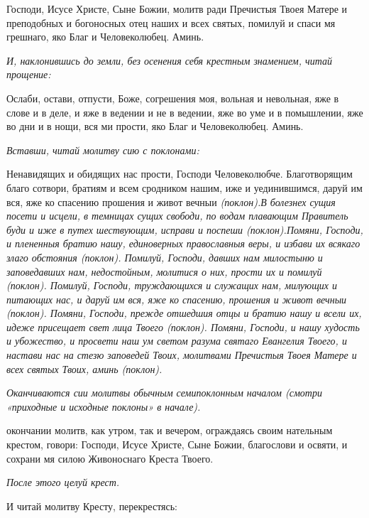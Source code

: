 

Господи, Исусе Христе, Сыне Божии, молитв ради Пречистыя Твоея Матере и преподобных и богоносных отец наших и всех святых, помилуй и спаси мя грешнаго, яко Благ и Человеколюбец. Аминь.


\medskip\itshape И, наклонившись до земли, без осенения себя крестным знамением, читай прощение: \normalfont{}


Ослаби, остави, отпусти, Боже, согрешения моя, вольная и невольная, яже в слове и в деле, и яже в ведении и не в ведении, яже во уме и в помышлении, яже во дни и в нощи, вся ми прости, яко Благ и Человеколюбец. Аминь. 


\medskip\itshape Вставши, читай молитву сию с поклонами:\normalfont{}


Ненавидящих и обидящих нас прости, Господи Человеколюбче. Благотворящим благо сотвори, братиям и всем сродником нашим, иже и уединившимся, даруй им вся, яже ко спасению прошения и живот вечныи \itshape (поклон)\normalfont{}.В болезнех сущия посети и исцели, в темницах сущих свободи, по водам плавающим Правитель буди и иже в путех шествующим, исправи и поспеши \itshape (поклон)\normalfont{}.Помяни, Господи, и плененныя братию нашу, единоверных православныя веры, и избави их всякаго злаго обстояния \itshape (поклон)\normalfont{}. Помилуй, Господи, давших нам милостыню и заповедавших нам, недостойным, молитися о них, прости их и помилуй \itshape (поклон)\normalfont{}. Помилуй, Господи, труждающихся и служащих нам, милующих и питающих нас, и даруй им вся, яже ко спасению, прошения и живот вечныи \itshape (поклон)\normalfont{}. Помяни, Господи, прежде отшедшия отцы и братию нашу и всели их, идеже присещает свет лица Твоего \itshape (поклон)\normalfont{}. Помяни, Господи, и нашу худость и убожество, и просвети наш ум светом разума святаго Евангелия Твоего, и настави нас на стезю заповедей Твоих, молитвами Пречистыя Твоея Матере и всех святых Твоих, аминь \itshape (поклон)\normalfont{}.


\medskip\itshape Оканчиваются сии молитвы обычным семипоклонным началом (смотри «приходные и исходные поклоны» в начале). \normalfont{}


 окончании молитв, как утром, так и вечером, ограждаясь своим нательным крестом, говори: Господи, Исусе Христе, Сыне Божии, благослови и освяти, и сохрани мя силою Живоноснаго Креста Твоего. 


\medskip\itshape После этого целуй крест.


И читай молитву Кресту, перекрестясь:\normalfont{}


